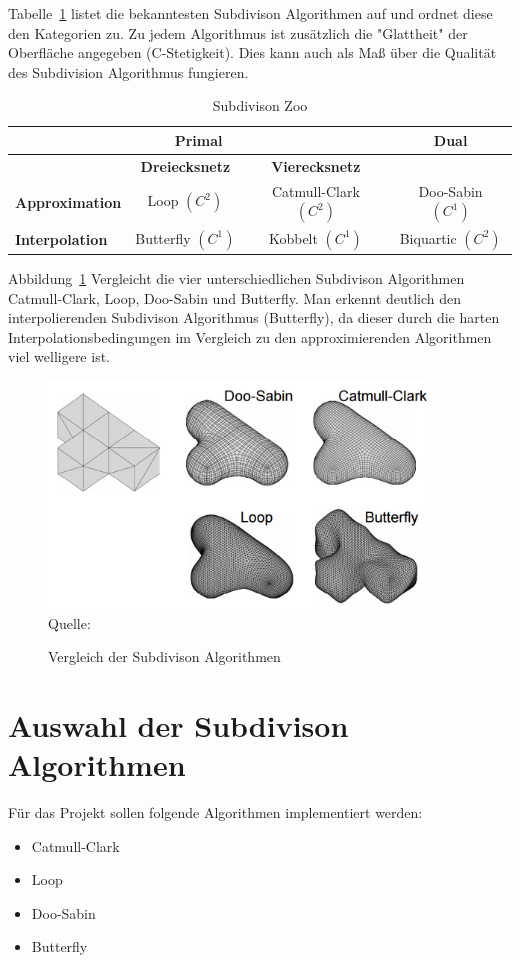 Tabelle~\ref{tab:sd_comp} listet die bekanntesten Subdivison Algorithmen auf und ordnet diese den Kategorien zu.
Zu jedem Algorithmus ist zusätzlich die "Glattheit" der Oberfläche angegeben (C-Stetigkeit).
Dies kann auch als Maß über die Qualität des Subdivision Algorithmus fungieren.
\begin{table}[h]
\caption{Subdivison Zoo}
\center
\begin{tabular}{|l|c|c|c}
\toprule
\multicolumn{3}{c|}{\textbf{Primal}} & \textbf{Dual}\\
\midrule
& \textbf{Dreiecksnetz} & \textbf{Vierecksnetz} & \\
\midrule
\textbf{Approximation} & Loop \((C^2)\) & Catmull-Clark \((C^2)\) & Doo-Sabin \((C^1)\) \\
\textbf{Interpolation} & Butterfly \((C^1)\) & Kobbelt \((C^1)\) & Biquartic \((C^2)\) \\
\bottomrule
\end{tabular}
\label{tab:sd_comp}
\end{table}

Abbildung~\ref{fig:sd_comp} Vergleicht die vier unterschiedlichen Subdivison Algorithmen Catmull-Clark, Loop, Doo-Sabin und Butterfly.
Man erkennt deutlich den interpolierenden Subdivison Algorithmus (Butterfly),
da dieser durch die harten Interpolationsbedingungen im Vergleich zu den approximierenden Algorithmen viel welligere ist.
\begin{figure}[h]
  \caption{Vergleich der Subdivison Algorithmen}
  \centering
  \includegraphics[width=0.9\textwidth]{content/media/sd_overview.png}
  \\Quelle: \cite{Standford.24.07.2015}
  \label{fig:sd_comp}
\end{figure}

\section{Auswahl der Subdivison Algorithmen}

Für das Projekt sollen folgende Algorithmen implementiert werden:
\begin{itemize}
	\item Catmull-Clark
	\item Loop
	\item Doo-Sabin
	\item Butterfly
\end{itemize}


